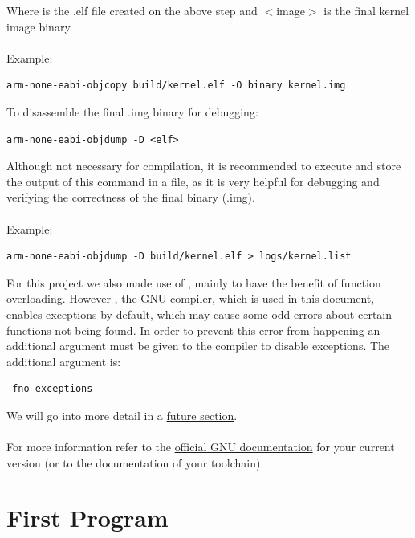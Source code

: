 \documentclass[12pt, svgnames]{book}
\begin{document}
Where  is the .elf file created on the above step and $<$image$>$ is the final kernel image binary. 
\\~\\
Example:
\begin{lstlisting}[style = bash, xleftmargin=0\textwidth]
	arm-none-eabi-objcopy build/kernel.elf -O binary kernel.img
\end{lstlisting}

To \hypertarget{dasm}{disassemble} the final .img binary for debugging:
\begin{lstlisting}[style = bash, xleftmargin=0\textwidth]
	arm-none-eabi-objdump -D <elf>
\end{lstlisting}

Although not necessary for compilation, it is recommended to execute and store the output of this command in a file, as it is very helpful for debugging and verifying the correctness of the final binary (.img).
\\~\\
Example:
\begin{lstlisting}[style = bash, xleftmargin=0\textwidth]
	arm-none-eabi-objdump -D build/kernel.elf > logs/kernel.list
\end{lstlisting}

For this project we also made use of , mainly to have the benefit of function overloading. However , the GNU  compiler, which is used in this document, enables exceptions by default, which may cause some odd errors about certain functions not being found. In order to prevent this error from happening an additional argument must be given to the  compiler to disable exceptions. The additional argument is:
\begin{lstlisting}[style = bash, xleftmargin=0\textwidth]
	-fno-exceptions
\end{lstlisting}

We will go into more detail in a \hyperref[sec:Programming Languages]{future section}.
\\~\\
For more information refer to the \href{https://\notengl{gcc}.gnu.org/onlinedocs/}{official GNU documentation} for your current version (or to the documentation of your toolchain).

\section{First Program}
\label{sec:first program}
\end{document}

